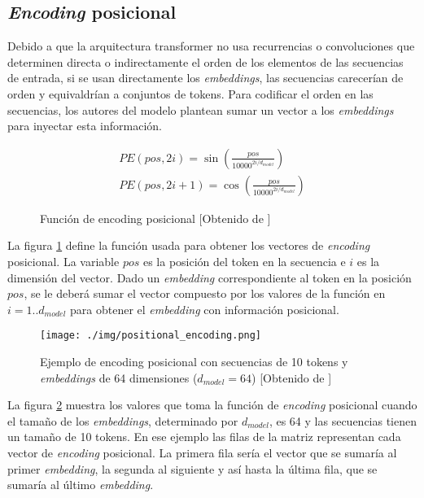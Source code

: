 \subsection{\textit{Encoding} posicional}
Debido a que la arquitectura transformer no usa recurrencias o convoluciones que determinen directa o indirectamente el orden de los elementos de las secuencias de entrada, si se usan directamente los \textit{embeddings}, las secuencias carecerían de orden y equivaldrían a conjuntos de tokens.
Para codificar el orden en las secuencias, los autores del modelo plantean sumar un vector a los \textit{embeddings} para inyectar esta información.

\begin{figure}[H]
    \begin{align*}
        PE(pos,2i)=\sin\left(\frac{pos}{10000^{2i / d_{model}}}\right)\\
        PE(pos,2i+1)=\cos\left(\frac{pos}{10000^{2i / d_{model}}}\right)
    \end{align*}
    \caption{Función de encoding posicional [Obtenido de \cite{Vaswani2017Jun}]}\label{transformerposfunc}
\end{figure}

La figura \ref{transformerposfunc} define la función usada para obtener los vectores de \textit{encoding} posicional. La variable $pos$ es la posición del token en la secuencia e $i$ es la dimensión del vector.
Dado un \textit{embedding} correspondiente al token en la posición $pos$, se le deberá sumar el vector compuesto por los valores de la función en $i=1..d_{model}$ para obtener el \textit{embedding} con información posicional.

\begin{figure}[H]
    \centering
        \texttt{[image: ./img/positional\_encoding.png]}
        \caption{Ejemplo de encoding posicional con secuencias de 10 tokens y \textit{embeddings} de 64 dimensiones ($d_{model}=64$) [Obtenido de \cite{Alammar2021Dec}]}\label{transformerposicional}
\end{figure}

La figura \ref{transformerposicional} muestra los valores que toma la función de \textit{encoding} posicional cuando el tamaño de los \textit{embeddings}, determinado por $d_{model}$, es 64 y las secuencias tienen un tamaño de 10 tokens. En ese ejemplo las filas de la matriz representan cada vector de \textit{encoding} posicional. La primera fila sería el vector que se sumaría al primer \textit{embedding}, la segunda al siguiente y así hasta la última fila, que se sumaría al último \textit{embedding}.

